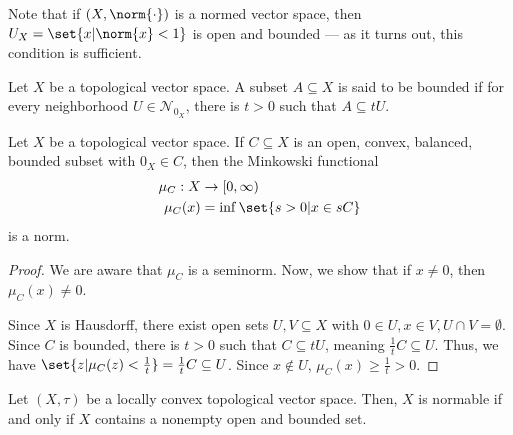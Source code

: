 \documentclass[10pt]{mypackage}
\begin{document}
Note that if $\left(X,\norm{\cdot}\right)$ is a normed vector space, then $U_X = \set{x | \norm{x} < 1}$ is open and bounded --- as it turns out, this condition is sufficient.
\begin{definition}
  Let $X$ be a topological vector space. A subset $A\subseteq X$ is said to be bounded if for every neighborhood $U\in \mathcal{N}_{0_X}$, there is $t > 0$ such that $A\subseteq tU$.
\end{definition}
\begin{lemma}
  Let $X$ be a topological vector space. If $C\subseteq X$ is an open, convex, balanced, bounded subset with $0_X\in C$, then the Minkowski functional
  \begin{align*}
    \mu_{C}: X&\rightarrow [0,\infty)\\
    \mu_{C}(x) &= \inf\set{s > 0 | x\in sC}
  \end{align*}
  is a norm.
\end{lemma}
\begin{proof}
  We are aware that $\mu_{C}$ is a seminorm. Now, we show that if $x\neq 0$, then $\mu_{C}\left(x\right) \neq 0$.\newline

  Since $X$ is Hausdorff, there exist open sets $U,V\subseteq X$ with $0\in U,x\in V,U\cap V = \emptyset$. Since $C$ is bounded, there is $t > 0$ such that $C\subseteq tU$, meaning $\frac{1}{t}C \subseteq U$. Thus, we have $\set{z | \mu_{C}(z) < \frac{1}{t}} = \frac{1}{t}C \subseteq U$. Since $x\notin U$, $\mu_{C}\left(x\right) \geq \frac{1}{t} > 0$.
\end{proof}
\begin{proposition}
  Let $\left(X,\tau\right)$ be a locally convex topological vector space. Then, $X$ is normable if and only if $X$ contains a nonempty open and bounded set.
\end{proposition}
\end{document}
